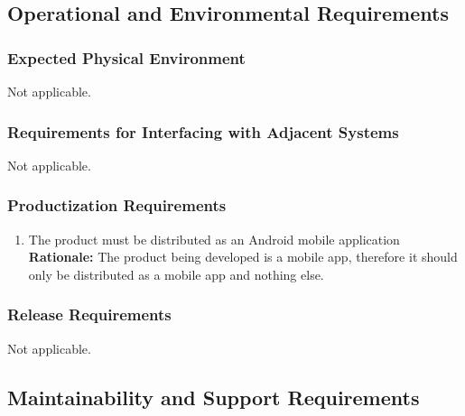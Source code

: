 \documentclass[]{article}
\begin{document}

\subsection{Operational and Environmental Requirements}
\label{sub:operational_and_environmental_requirements}

\subsubsection{Expected Physical Environment}
\label{ssub:expected_physical_environment}
Not applicable.

\subsubsection{Requirements for Interfacing with Adjacent Systems}
\label{ssub:requirements_for_interfacing_with_adjacent_systems}
Not applicable.

\subsubsection{Productization Requirements}
\label{ssub:productization_requirements}
\begin{enumerate}[{OE-P}1. ]
	\item The product must be distributed as an Android mobile application \\
	{\bf Rationale:} The product being developed is a mobile app, therefore it should only be distributed as a mobile app and nothing else.
\end{enumerate}

\subsubsection{Release Requirements}
\label{ssub:release_requirements}
Not applicable.


\subsection{Maintainability and Support Requirements}
\label{sub:maintainability_and_support_requirements}
\end{document}
